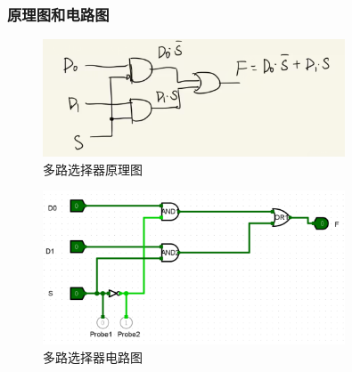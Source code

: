 \documentclass{article}
\begin{document}
    \subsubsection{原理图和电路图}
    \begin{figure}[H]
    \centering
    \includegraphics[width=0.8\textwidth]{3.4.1.png}
    \caption{多路选择器原理图}
    \end{figure}

    \begin{figure}[H]
    \centering
    \includegraphics[width=0.8\textwidth]{3.4.2.png}
    \caption{多路选择器电路图}
    \end{figure}
\end{document}
